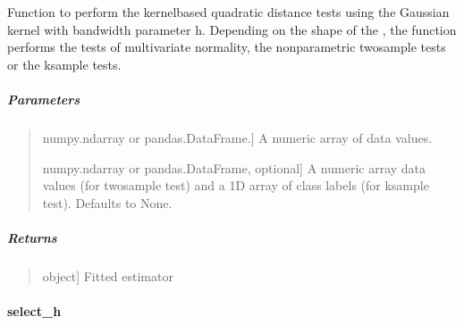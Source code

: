 \documentclass[letterpaper,10pt,english,openany,oneside]{sphinxmanual}
\begin{document}
{{{{\begin{fulllineitems}
\label{\detokenize{api_reference/generated/QuadratiK.kernel_test.KernelTest:QuadratiK.kernel_test.KernelTest.test}}
\pysigstartsignatures
{}
\pysigstopsignatures
\sphinxAtStartPar
Function to perform the kernel\sphinxhyphen{}based quadratic distance tests using
the Gaussian kernel with bandwidth parameter h.
Depending on the shape of the , the function performs the tests of
multivariate normality, the non\sphinxhyphen{}parametric two\sphinxhyphen{}sample tests or the k\sphinxhyphen{}sample tests.


\subparagraph{Parameters}
\label{\detokenize{api_reference/generated/QuadratiK.kernel_test.KernelTest:id3}}\begin{quote}
\begin{description}
\sphinxlineitem{x}{[}numpy.ndarray or pandas.DataFrame.{]}
\sphinxAtStartPar
A numeric array of data values.

\sphinxlineitem{y}{[}numpy.ndarray or pandas.DataFrame, optional{]}
\sphinxAtStartPar
A numeric array data values (for two\sphinxhyphen{}sample test) and a 1D array of class labels
(for k\sphinxhyphen{}sample test). Defaults to None.

\end{description}
\end{quote}


\subparagraph{Returns}
\label{\detokenize{api_reference/generated/QuadratiK.kernel_test.KernelTest:id4}}\begin{quote}
\begin{description}
\sphinxlineitem{self}{[}object{]}
\sphinxAtStartPar
Fitted estimator

\end{description}
\end{quote}

\end{fulllineitems}




\sphinxstepscope


\paragraph{select\_h}
\label{\detokenize{api_reference/generated/QuadratiK.kernel_test.select_h:select-h}}\label{\detokenize{api_reference/generated/QuadratiK.kernel_test.select_h::doc}}

}}}}
\end{document}
